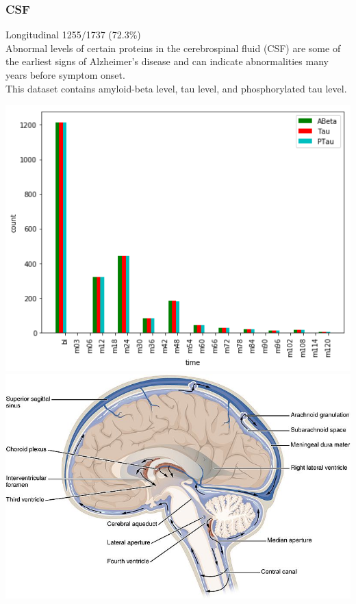 \documentclass{beamer}
\begin{document}
    \begin{frame}
        \frametitle{CSF}
        Longitudinal \hfill 1255/1737 (72.3\%) \\
        \vspace{0.2in}
        Abnormal levels of certain proteins in the cerebrospinal fluid (CSF) are some of the earliest signs of Alzheimer's disease and can indicate abnormalities many years before symptom onset. \\
        \vspace{0.2in}
        This dataset contains amyloid-beta level, tau level, and phosphorylated tau level.
        \begin{center}
            \includegraphics[height=0.4\paperheight]{images/csf_times.png}
            \includegraphics[height=0.4\paperheight]{images/csf.jpg}
        \end{center}
    \end{frame}
\end{document}
